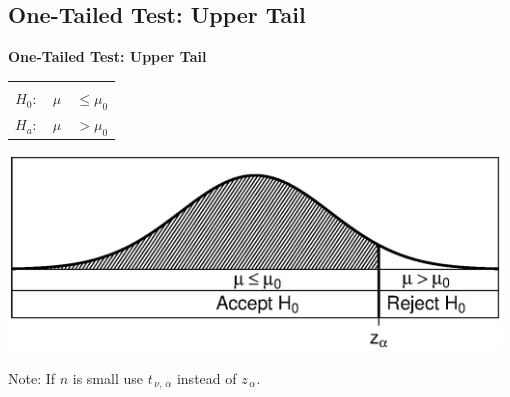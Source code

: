 \documentclass[compress]{beamer}        %
\makeatletter
\newcommand{\tcb}{\textcolor{beamer@blendedblue}}
\makeatother
\begin{document}
\subsection{One-Tailed Test: Upper Tail}
\begin{frame}{\bf \tcb{One-Tailed Test: Upper Tail}}
\begin{center}
\begin{tabular}{|c@{\,\,}c|}
\hline
&\\[-0.4cm]
$H_0: \quad \mu$ & $\le \mu_0$ \\[0.2cm]
$H_a: \quad \mu$ &  $> \mu_0$ \\[0.1cm]
\hline
\end{tabular}
\end{center}
\begin{center}
\includegraphics[width=0.98\textwidth, trim = 1.5cm 1.6cm 0.7cm 1.5cm, clip]{AcceptRegionOne2}
\end{center}
Note: If $n$ is small use  $t_{\,\nu,\,\alpha}$ instead of $ z_{\,\alpha}$.
\end{frame}
\end{document}
